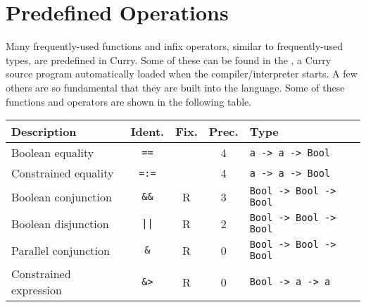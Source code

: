 \section{Predefined Operations}
\label{Predefined Operations}

Many frequently-used functions and infix operators,
similar to frequently-used types, are predefined in Curry.
Some of these can be found in the ,
a Curry source program automatically loaded when the
compiler/interpreter starts.
A few others are so fundamental that they are built into the language.
Some of these functions and operators are shown in the following table.
%
\begin{center}
\begin{tabular}{@{} || l | c | c | c | l || @{}}
\hline \hline
\bf Description & \bf Ident. & \bf Fix. & \bf Prec. & \bf Type \\
\hline \hline
Boolean equality & {\tt ==} & & 4 & {\tt a -> a -> Bool} \\
\hline
Constrained equality & {\tt =:=} & & 4 & {\tt a -> a -> Bool} \\
\hline
Boolean conjunction & {\tt \&\&} & R & 3 & {\tt Bool -> Bool -> Bool} \\
\hline
Boolean disjunction & {\tt ||} & R & 2 & {\tt Bool -> Bool -> Bool} \\
\hline
Parallel conjunction & {\tt \&} & R & 0 & {\tt Bool -> Bool -> Bool} \\
\hline
Constrained expression & {\tt \&>} & R & 0 & {\tt Bool -> a -> a} \\
\hline
\hline
\end{tabular}
\end{center}
\pindex{==}\pindex{=:=}\pindex{\&\&}\pindex{\&}\pindex{\&>}

